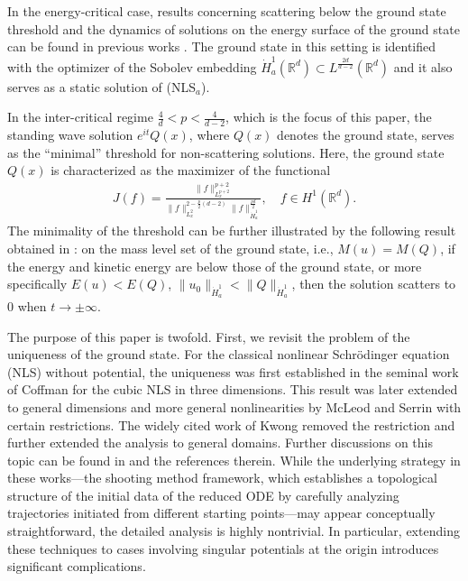 \documentclass[12pt]{amsart}
\newcommand{\R}{\mathbb R}
\newcommand{\dha}{\dot H^1_a}
\begin{document}
 In the energy-critical case, results concerning scattering below the ground state threshold and the dynamics of solutions on the energy surface of the ground state can be found in previous works \cite{Y20, Y21, YZ23, YZZ22}. The ground state in this setting is identified with the optimizer of the Sobolev embedding $\dha (\R^d)\subset L^{\frac{2d}{d-2}}(\R^d)$ and it also serves as a static solution of (NLS$_a$). 

 In the inter-critical regime $\frac 4d<p<\frac 4{d-2}$, which is the focus of this paper, the standing wave solution $e^{it}Q(x)$, where $Q(x)$  denotes the ground state, serves as the ``minimal'' threshold for non-scattering solutions. Here, the ground state $Q(x)$ is characterized as the maximizer of the functional 
\begin{align}\label{4}
J(f)=\frac{\|f\|_{L_x^{p+2}}^{p+2}}{\|f\|_{L_x^2}^{2-\frac p2(d-2)}\|f\|_{\dha}^{\frac{pd}2}}, \quad f \in H^1 (\R^d).
\end{align}
The minimality of the threshold can be further illustrated by the following result obtained in \cite{KMVZ17,  LMM18}:
on the mass level set of the ground state, i.e., $M(u)=M(Q)$, if the energy and kinetic energy are below those of the ground state, or more specifically $E(u)<E(Q)$, $\|u_0\|_{\dot H^1_a}<\|Q\|_{\dot H^1_a}$, then the solution scatters to $0$ when $t\to \pm \infty$. 

  
  
    The purpose of this paper is twofold. First, we revisit the problem of the uniqueness of the ground state. For the classical nonlinear Schr\"odinger equation (NLS) without potential, the uniqueness was first established in the seminal work of Coffman \cite{C72} for the cubic NLS in three dimensions. This result was later extended to general dimensions and more general nonlinearities by McLeod and Serrin \cite{MS81, MS87} with certain restrictions. The widely cited work of Kwong \cite{Kwong} removed the restriction and further extended the analysis to general domains. Further discussions on this topic can be found in \cite{CJ93,KL92,KZ91,Tang03} and the references therein. While the underlying strategy in these works—the shooting method framework, which establishes a topological structure of the initial data of the reduced ODE by carefully analyzing trajectories initiated from different starting points—may appear conceptually straightforward, the detailed analysis is highly nontrivial. In particular, extending these techniques to cases involving singular potentials at the origin introduces significant complications.
\end{document}

